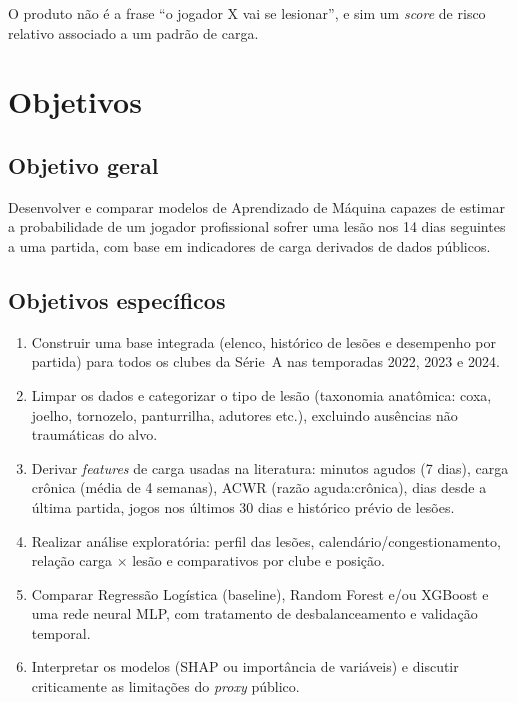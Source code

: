 \documentclass[11pt,a4paper]{article}
\begin{document}
O produto não é a frase ``o jogador X vai se lesionar'', e sim um \textit{score} de risco relativo associado a um padrão de carga.

\section{Objetivos}

\subsection{Objetivo geral}

Desenvolver e comparar modelos de Aprendizado de Máquina capazes de estimar a probabilidade de um jogador profissional sofrer uma lesão nos 14 dias seguintes a uma partida, com base em indicadores de carga derivados de dados públicos.

\subsection{Objetivos específicos}

\begin{enumerate}
  \item Construir uma base integrada (elenco, histórico de lesões e desempenho por partida) para todos os clubes da Série~A nas temporadas 2022, 2023 e 2024.
  \item Limpar os dados e categorizar o tipo de lesão (taxonomia anatômica: coxa, joelho, tornozelo, panturrilha, adutores etc.), excluindo ausências não traumáticas do alvo.
  \item Derivar \textit{features} de carga usadas na literatura: minutos agudos (7 dias), carga crônica (média de 4 semanas), ACWR (razão aguda:crônica), dias desde a última partida, jogos nos últimos 30 dias e histórico prévio de lesões.
  \item Realizar análise exploratória: perfil das lesões, calendário/congestionamento, relação carga $\times$ lesão e comparativos por clube e posição.
  \item Comparar Regressão Logística (baseline), Random Forest e/ou XGBoost e uma rede neural MLP, com tratamento de desbalanceamento e validação temporal.
  \item Interpretar os modelos (SHAP ou importância de variáveis) e discutir criticamente as limitações do \textit{proxy} público.
\end{enumerate}
\end{document}
